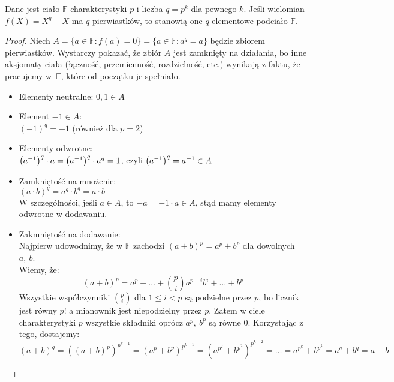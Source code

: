 \begin{theorem}
	Dane jest ciało \( \mathbb{F} \) charakterystyki \( p \) i liczba \( q = p^k \) dla pewnego \( k \). Jeśli wielomian \( f(X) = X^q - X \) ma \( q \) pierwiastków, to stanowią one \( q \)-elementowe podciało \( \mathbb{F} \).
\end{theorem}
\begin{proof}
	Niech \( A = \{a \in \mathbb{F}: f(a) = 0\} = \{a \in \mathbb{F}: a^q = a\} \) będzie zbiorem pierwiastków. Wystarczy pokazać, że zbiór \( A \) jest zamknięty na działania, bo inne aksjomaty ciała (łączność, przemienność, rozdzielność, etc.) wynikają z faktu, że pracujemy w~\( \mathbb{F} \), które od początku je spełniało.
	\begin{itemize}
		\item Elementy neutralne: \( 0, 1 \in A \)
		\item Element \( -1 \in A \): \\
		      \( (-1)^q = -1 \) (również dla \( p = 2 \))
		\item Elementy odwrotne: \\
		      \( \left(a^{-1}\right)^q \cdot a = \left(a^{-1}\right)^q \cdot a^q = 1 \), czyli \( \left(a^{-1}\right)^q = a^{-1} \in A \)
		\item Zamkniętość na mnożenie: \\
		      \( (a \cdot b)^q = a^q \cdot b^q = a \cdot b \) \\
		      W szczególności, jeśli \( a \in A \), to \( -a = -1 \cdot a \in  A \), stąd mamy elementy odwrotne w dodawaniu.
		\item Zakmniętość na dodawanie: \\
		      Najpierw udowodnimy, że w \( \mathbb{F} \) zachodzi \( (a + b)^p = a^p + b^p \) dla dowolnych \( a, \ b \). \\
		      Wiemy, że:
		      \[
			      (a + b)^p = a^p + \ldots + {p \choose i}a^{p-i}b^i + \ldots + b^p
		      \]
		      Wszystkie współczynniki \( p \choose i \) dla \( 1 \leq i < p \) są podzielne przez \( p \), bo licznik jest równy \( p! \) \linebreak a mianownik jest niepodzielny przez \( p \).
		      Zatem w ciele charakterystyki \( p \) wszystkie składniki oprócz \( a^p, \ b^p \) są równe \( 0 \).
		      Korzystając z tego, dostajemy:
		      \[
			      (a + b)^q = ((a + b)^p)^{p^{k-1}} = (a^p + b^p)^{p^{k-1}} = (a^{p^2} + b^{p^2})^{p^{k-2}} = \ldots = a^{p^k} + b^{p^k} = a^q + b^q = a + b
		      \]
	\end{itemize}
\end{proof}

